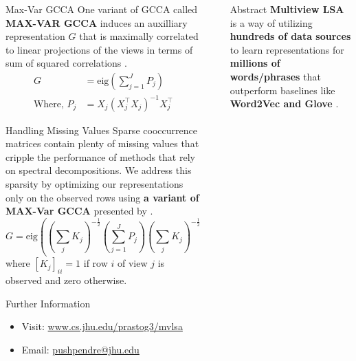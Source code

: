 \begin{frame}[t]
\begin{columns}[t]
\begin{column}{\onecolwid}
\begin{block}{Max-Var GCCA}
    One variant of GCCA called \textbf{MAX-VAR GCCA} induces an auxilliary representation $G$
    that is maximally correlated to linear projections of the views 
    in terms of sum of squared correlations \cite{carroll1968generalization,kettenring1971canonical}.
    \begin{align*}
      G &= \text{eig}\left(\sum_{j=1}^J P_j \right)\\
      \text{Where, } P_j &=  X_j(X_j^\top X_j)^{-1}X_j^\top
    \end{align*}
  \end{block}
  \begin{block}{Handling Missing Values}
    Sparse cooccurrence matrices contain plenty of missing values
    that cripple the performance of methods that rely on
    spectral decompositions. We address this sparsity by optimizing our
    representations only on the observed rows using \textbf{a variant
      of MAX-Var GCCA} presented by
    \cite{van2006generalized}.
    \begin{equation}
      G = \text{eig}\left( (\sum_j K_j)^{-\frac{1}{2}} (\sum_{j=1}^J P_j)
      (\sum_j K_j)^{-\frac{1}{2}} \right)
    \end{equation}
    where $[K_j]_{ii} = 1$ if row $i$ of view $j$ is observed and zero
    otherwise.
  \end{block}
  \begin{alertblock}{Further Information}
    \begin{itemize}
    \item Visit: \href{http://www.cs.jhu.edu/~prastog3/mvlsa}{www.cs.jhu.edu/\mytld{}prastog3/mvlsa}
    \item Email: \href{mailto:pushpendre@jhu.edu}{pushpendre@jhu.edu}
    \end{itemize}
  \end{alertblock}
\end{column}
\begin{column}{\sepwid}\end{column} 
\begin{column}{\twocolwid}\vspace{-0.5in}
  \begin{alertblock}{Abstract}
    {\Large \textbf{Multiview LSA} is a way of utilizing \textbf{hundreds of data sources} to
    learn representations for \textbf{millions of words/phrases} that
    outperform baselines like \textbf{Word2Vec and Glove}
    \cite{mikolov2013distributed,pennington2014glove}.}
  \end{alertblock}


\end{column}
\end{columns}
\end{frame}
